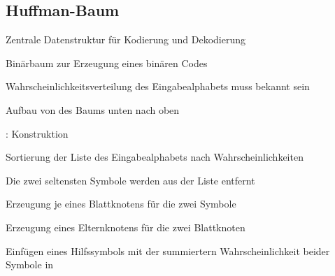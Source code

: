 \documentclass[xcolor=table,presentation]{beamer}    %
\newenvironment{witemize}{\itemize\setlength{\itemsep}{0.5em}}{\enditemize}
\begin{document}
\subsection{Huffman-Baum}

\begin{frame}[<+->]{\insertsubsection}
  \begin{witemize}
  \item Zentrale Datenstruktur für Kodierung und Dekodierung
  \item Binärbaum zur Erzeugung eines binären Codes
  \item Wahrscheinlichkeitsverteilung des Eingabealphabets muss bekannt sein
  \item Aufbau von des Baums unten nach oben
  \end{witemize}
\end{frame}

\begin{frame}[<+->]{\insertsubsection: Konstruktion}
  \begin{witemize}
  \item Sortierung der Liste des Eingabealphabets nach Wahrscheinlichkeiten
  \item Die zwei seltensten Symbole werden aus der Liste entfernt
  \item Erzeugung je eines Blattknotens für die zwei Symbole
  \item Erzeugung eines Elternknotens für die zwei Blattknoten
  \item Einfügen eines Hilfssymbols mit der summiertern
    Wahrscheinlichkeit beider Symbole in 
  \end{witemize}
\end{frame}
\end{document}
